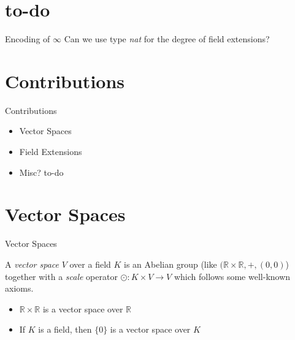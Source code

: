 \documentclass[%
	sans,
	12pt,
]{beamer}
\newcommand{\high}[1]{{\usebeamercolor[fg]{structure} #1}}
\newcommand{\RR}{\mathbb{R}}
\begin{document}
\section{to-do}
\begin{frame}{Encoding of $\infty$}
Can we use type \emph{nat} for the degree of field extensions?\pause
{}
\end{frame}

\section{Contributions}
\begin{frame}{Contributions}
\begin{itemize}
	\item Vector Spaces\pause
	\item Field Extensions\pause
	\item Misc? to-do
\end{itemize}
\end{frame}

\section{Vector Spaces}
\begin{frame}
\begin{center}
\huge\high{Vector Spaces}
\end{center}
\end{frame}

\begin{frame}
A \emph{vector space} $V$ over a field $K$ is an Abelian group (like $(\RR\times\RR,+,(0,0)$) together with a \emph{scale} operator $\odot:K\times V \to V$ which follows some well-known axioms.
\begin{itemize}%
\item $\RR \times \RR$ is a vector space over $\RR$\pause
\item If $K$ is a field, then $\{0\}$ is a vector space over $K$\pause
\end{itemize}
\end{frame}
\end{document}
